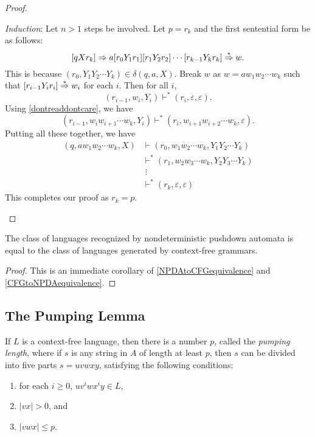 \begin{proof}
\begin{itemize}
        \vspace{1mm}
        \textit{Induction}: Let $n>1$ steps be involved. Let $p=r_k$ and the first sentential form be as follows:
        $$[qXr_k]\Rightarrow a[r_0Y_1r_1][r_1Y_2r_2]\cdots[r_{k-1}Y_kr_k]\overset{*}{\Rightarrow} w.$$
        This is because $(r_0,Y_1Y_2\cdots Y_k)\in\delta(q,a,X)$. Break $w$ as $w=aw_1w_2\cdots w_k$ such that $[r_{i-1}Y_ir_i]\overset{*}{\Rightarrow} w_i$ for each $i$. Then for all $i$,
        $$(r_{i-1}, w_i, Y_i)\vdash^* (r_i,\varepsilon,\varepsilon).$$
        Using \ref{dontreaddontcare}, we have
        $$(r_{i-1}, w_iw_{i+1}\cdots w_k, Y_i)\vdash^* (r_i,w_{i+1}w_{i+2}\cdots w_k,\varepsilon).$$
        Putting all these together, we have
        \begin{align*}
            (q,aw_1w_2\cdots w_k, X)&\vdash (r_0, w_1w_2\cdots w_k, Y_1Y_2\cdots Y_k) \\
            &\vdash^* (r_1, w_2w_3\cdots w_k, Y_2Y_3\cdots Y_k) \\
            &\; \vdots \\
            &\vdash^* (r_k,\varepsilon,\varepsilon)
        \end{align*}
        This completes our proof as $r_k=p$.
    \end{itemize}
\end{proof}

\begin{theorem}
    The class of languages recognized by nondeterministic pushdown automata is equal to the class of languages generated by context-free grammars.
\end{theorem}
\begin{proof}
    This is an immediate corollary of \ref{NPDAtoCFGequivalence} and \ref{CFGtoNPDAequivalence}.
\end{proof}

\subsection{The Pumping Lemma}

\begin{lemma}
    If $L$ is a context-free language, then there is a number $p$, called the \textit{pumping length}, where if $s$ is any string in $A$ of length at least $p$, then $s$ can be divided into five parts $s=uvwxy$, satisfying the following conditions:
    \begin{enumerate}
        \item for each $i\geq 0$, $uv^iwx^iy\in L$,
        \item $|vx|>0$, and
        \item $|vwx|\leq p$.
    \end{enumerate}
\end{lemma}

\clearpage